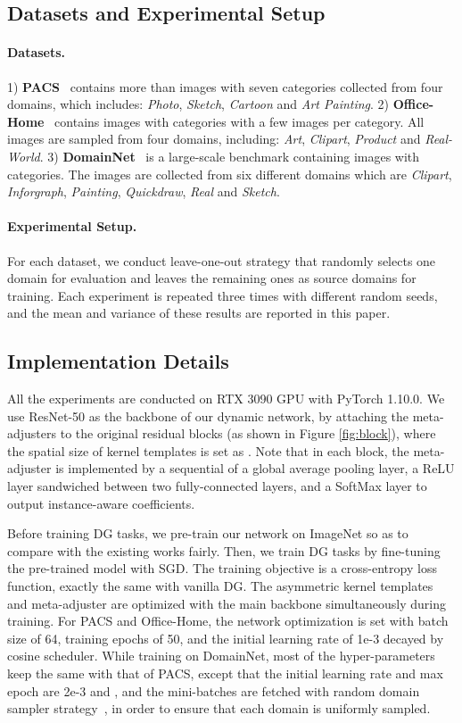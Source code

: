 \documentclass{article}
\begin{document}
\subsection{Datasets and Experimental Setup} 
\paragraph{Datasets.}
1) \textbf{PACS}~\cite{pacs} contains more than  images with seven categories collected from four domains, which includes: \textit{Photo}, \textit{Sketch}, \textit{Cartoon} and \textit{Art Painting}. 
2) \textbf{Office-Home}~\cite{venkateswara2017OfficeHome} contains  images with  categories with a few images per category. All images are sampled from four domains, including: \textit{Art}, \textit{Clipart}, \textit{Product} and \textit{Real-World}. 
3) \textbf{DomainNet}~\cite{DomainNet} is a large-scale benchmark containing  images with  categories. The images are collected from six different domains which are \textit{Clipart}, \textit{Inforgraph}, \textit{Painting}, \textit{Quickdraw}, \textit{Real} and \textit{Sketch}.

\paragraph{Experimental Setup.}
For each dataset, we conduct leave-one-out strategy that randomly selects one domain for evaluation and leaves the remaining ones as source domains for training. Each experiment is repeated three times with different random seeds, and the mean and variance of these results are reported in this paper.
 
\subsection{Implementation Details}
All the experiments are conducted on RTX 3090 GPU with PyTorch 1.10.0. We use ResNet-50 as the backbone of our dynamic network, by attaching the meta-adjusters to the original residual blocks (as shown in Figure \ref{fig:block}), where the spatial size of kernel templates is set as . Note that in each block, the meta-adjuster is implemented by a sequential of a global average pooling layer, a ReLU layer sandwiched between two fully-connected layers, and a SoftMax layer to output instance-aware coefficients. 

Before training DG tasks, we pre-train our network on ImageNet so as to compare with the existing works fairly. Then, we train DG tasks by fine-tuning the pre-trained model with SGD. 
The training objective is a cross-entropy loss function, exactly the same with vanilla DG. The asymmetric kernel templates and meta-adjuster are optimized with the main backbone simultaneously during training.
For PACS and Office-Home, the network optimization is set with batch size of 64, training epochs of 50, and the initial learning rate of 1e-3 decayed by cosine scheduler. While training on DomainNet, most of the hyper-parameters keep the same with that of PACS, except that the initial learning rate and max epoch are 2e-3 and , and the mini-batches are fetched with random domain sampler strategy~\cite{mixstyle}, in order to ensure that each domain is uniformly sampled. 
\end{document}
